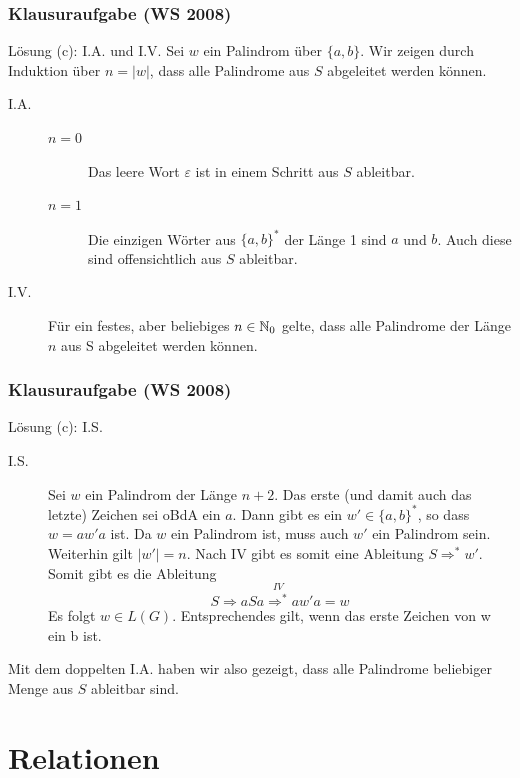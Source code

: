 \begin{frame}
	\frametitle{Klausuraufgabe (WS 2008)}

	\begin{block}{Lösung (c): I.A. und I.V.}
	Sei $w$ ein Palindrom über $\{a, b\}$. Wir zeigen durch Induktion über $n = \vert w \vert$, dass alle Palindrome aus $S$ abgeleitet werden können.
	\begin{description}
		\item[I.A.] \begin{description}
						\item[$n = 0$] Das leere Wort $\varepsilon$ ist in einem Schritt aus $S$ ableitbar.
						\item[$n = 1$] Die einzigen Wörter aus $\{a, b\}^\ast$ der Länge 1 sind $a$ und $b$. Auch diese sind offensichtlich aus $S$ ableitbar. 
					\end{description}
		\item[I.V.] Für ein festes, aber beliebiges $n \in \mathbb{N}_0$ gelte, dass alle Palindrome der Länge $n$ aus S abgeleitet werden können. 
		
	\end{description}
	\end{block}
\end{frame}

\begin{frame}
	\frametitle{Klausuraufgabe (WS 2008)}
	\begin{block}{Lösung (c): I.S.}
		\begin{description}
			\item[I.S.] Sei $w$ ein Palindrom der Länge $n + 2$. Das erste (und damit auch das letzte) Zeichen sei oBdA ein $a$. Dann gibt es ein $w' \in \{a, b\}^\ast$, so dass $w = aw'a$ ist. Da $w$ ein Palindrom ist, muss auch $w'$ ein Palindrom sein. Weiterhin gilt $|w'| = n$. \pause Nach IV gibt es somit eine Ableitung $S \Rightarrow^\ast w'$. Somit gibt es die Ableitung $$S \Rightarrow aSa \overset{IV}{\Rightarrow^\ast} aw'a = w$$ Es folgt $w \in L(G)$. \pause Entsprechendes gilt, wenn das erste Zeichen von w ein b ist. \\ 
		\end{description}
		Mit dem doppelten I.A. haben wir also gezeigt, dass alle Palindrome beliebiger Menge aus $S$ ableitbar sind.
	\end{block}

\end{frame}

\section{Relationen}
